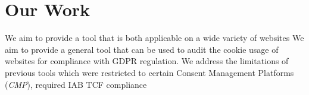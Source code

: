 \section{Our Work}
We aim to provide a tool that is both applicable on a wide variety of websites
We aim to provide a general tool that can be used to audit the cookie usage of websites for compliance with GDPR regulation.
We address the limitations of previous tools which were restricted to certain Consent Management Platforms (\emph{CMP}), required IAB TCF compliance~\cite{matte2020cookiebannersrespectchoice}